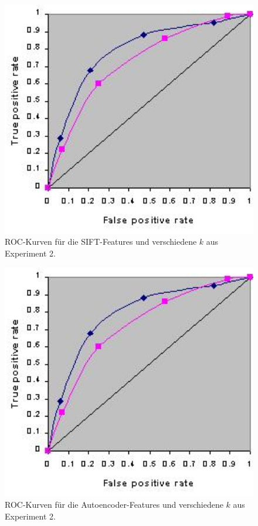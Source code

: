 \begin{figure}
	\centering
	\includegraphics[scale=0.4]{images/roc_ph.png}
	\caption{ROC-Kurven für die SIFT-Features und verschiedene $k$ aus Experiment 2.}
	\label{img:roc3}
\end{figure}

\begin{figure}
	\centering
	\includegraphics[scale=0.4]{images/roc_ph.png}
	\caption{ROC-Kurven für die Autoencoder-Features und verschiedene $k$ aus Experiment 2.}
	\label{img:roc4}
\end{figure}


